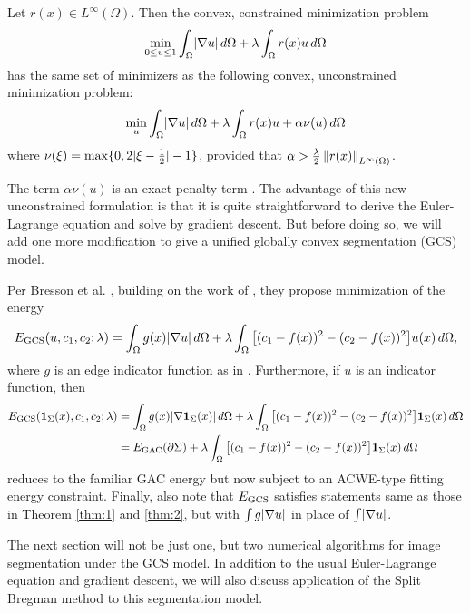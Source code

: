 \begin{thm}
	Let $r(x) \in L^\infty(\Omega)$. Then the convex, constrained minimization problem
	\begin{align*}
	\min_{0 \leq u \leq 1} \int_{\Omega} \lvert\nabla u\rvert \,d\Omega + \lambda \int_{\Omega} r(x) u \,d\Omega 
	\end{align*}
	has the same set of minimizers as the following convex, unconstrained minimization problem:
	\begin{align*}
	\min_u \int_{\Omega} \lvert\nabla u\rvert \,d\Omega + \lambda \int_{\Omega} r(x) u + \alpha \nu(u) \,d\Omega 
	\end{align*}
	where $\nu(\xi) = \max\{ 0 , 2\lvert\xi - \frac{1}{2} \rvert - 1\}$, provided that $\alpha > \frac{\lambda}{2}\left\lVert r(x)\right\rVert_{L^\infty(\Omega)}$.
	\label{thm:2}
\end{thm}
The term $\alpha\nu(u)$ is an exact penalty term \cite{hiriart1993convexI,hiriart1993convexII}. The advantage of this new unconstrained formulation is that it is quite straightforward to derive the Euler-Lagrange equation and solve by gradient descent. But before doing so, we will add one more modification to give a unified globally convex segmentation (GCS) model.

Per Bresson et al. \cite{bresson2007fast}, building on the work of \cite{chan2006algorithms}, they propose minimization of the energy 
\begin{align}
E_\textrm{GCS}(u, c_1, c_2; \lambda) = 
\int_{\Omega} g(x)  \lvert\nabla u\rvert \,d\Omega 
+ \lambda\int_{\Omega} \big[ (c_1 - f(x) )^2 - (c_2 - f(x))^2 \big] u(x) \,d\Omega,
\end{align}
where $g$ is an edge indicator function as in . Furthermore, if $u$ is an indicator function, then
\begin{align*}
E_\textrm{GCS}(\mathbf{1}_\Sigma(x), c_1, c_2; \lambda) 
&= \int_{\Omega} g(x)  \lvert\nabla \mathbf{1}_\Sigma(x)\rvert \,d\Omega 
+ \lambda\int_{\Omega} \big[ (c_1 - f(x) )^2 - (c_2 - f(x))^2 \big] \mathbf{1}_\Sigma(x) \,d\Omega
\\
&= E_\textrm{GAC}(\partial \Sigma) +  \lambda\int_{\Omega} \big[ (c_1 - f(x) )^2 - (c_2 - f(x))^2 \big] \mathbf{1}_\Sigma(x) \,d\Omega
\end{align*}
reduces to the familiar GAC energy but now subject to an ACWE-type fitting energy constraint. Finally, also note that $E_\textrm{GCS}$ satisfies statements same as those in Theorem \ref{thm:1} and \ref{thm:2}, but with $\int g\lvert\nabla u\rvert$ in place of $\int \lvert\nabla u\rvert$.

The next section will not be just one, but two numerical algorithms for image segmentation under the GCS model. In addition to the usual Euler-Lagrange equation and gradient descent, we will also discuss application of the Split Bregman method \cite{goldstein2010geometric,goldstein2009split} to this segmentation model.

